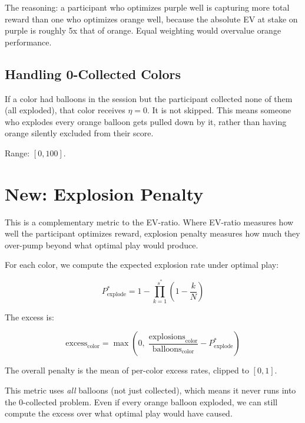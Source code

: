 \documentclass[11pt,a4paper]{article}
\begin{document}
The reasoning: a participant who optimizes purple well is capturing more
total reward than one who optimizes orange well, because the absolute EV
at stake on purple is roughly 5x that of orange. Equal weighting would
overvalue orange performance.

\subsection{Handling 0-Collected Colors}

If a color had balloons in the session but the participant collected none
of them (all exploded), that color receives $\eta = 0$. It is not skipped.
This means someone who explodes every orange balloon gets pulled down by it,
rather than having orange silently excluded from their score.

Range: $[0, 100]$.


\section{New: Explosion Penalty}
\label{sec:explosion_penalty}

This is a complementary metric to the EV-ratio. Where EV-ratio measures
how well the participant optimizes reward, explosion penalty measures
how much they over-pump beyond what optimal play would produce.

For each color, we compute the expected explosion rate under optimal play:

\begin{equation}
    P_{\text{explode}}^{*} = 1 - \prod_{k=1}^{s^*}\left(1 - \frac{k}{N}\right)
\end{equation}

The excess is:

\begin{equation}
    \text{excess}_\text{color} = \max\!\left(0,\;
        \frac{\text{explosions}_\text{color}}{\text{balloons}_\text{color}}
        - P_{\text{explode}}^{*}\right)
\end{equation}

The overall penalty is the mean of per-color excess rates, clipped to $[0, 1]$.

This metric uses \emph{all} balloons (not just collected), which means it
never runs into the 0-collected problem. Even if every orange balloon
exploded, we can still compute the excess over what optimal play would
have caused.
\end{document}
